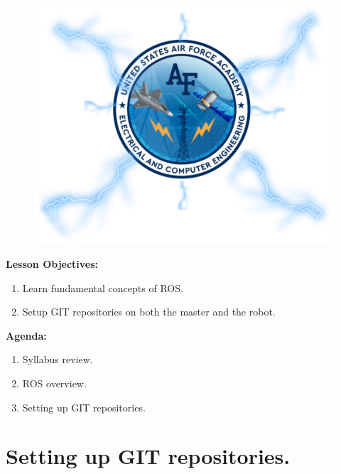 \documentclass{handout}
\begin{document}
\maketitle

\begin{figure}[H]
	\centering
	\includegraphics[width=.75\textwidth]{Cover.PNG}
\end{figure}

\textbf{Lesson Objectives:}
\begin{enumerate} \setlength\itemsep{0em}
	\item Learn fundamental concepts of ROS.
	\item Setup GIT repositories on both the master and the robot.
\end{enumerate}

\textbf{Agenda:}
\begin{enumerate} \setlength\itemsep{0em}
	\item Syllabus review.
	\item ROS overview.
	\item Setting up GIT repositories.
\end{enumerate}

\newpage
\clearpage
\pagebreak

\section{Setting up GIT repositories.}
\end{document}
